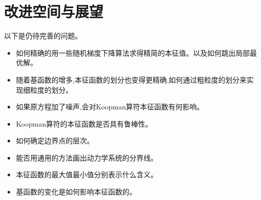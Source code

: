 \section{改进空间与展望}
以下是仍待完善的问题。
\begin{itemize}
    \item 如何精确的用一些随机梯度下降算法求得精简的本征值。以及如何跳出局部最优解。
    \item 随着基函数的增多,本征函数的划分也变得更精确,如何通过粗粒度的划分来实现细粒度的划分。
    \item 如果原方程加了噪声,会对Koopman算符本征函数有何影响。
    \item Koopman算符的本征函数是否具有鲁棒性。
    \item 如何确定边界点的层次。
    \item 能否用通用的方法画出动力学系统的分界线。
    \item 本征函数的最大值最小值分别表示什么含义。
    \item 基函数的变化是如何影响本征函数的。
\end{itemize}
% 
% 
